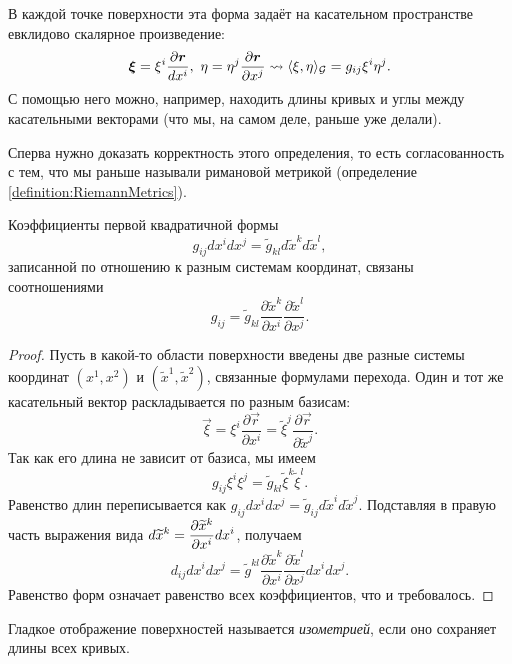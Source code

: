 В каждой точке поверхности эта форма задаёт на касательном пространстве евклидово скалярное произведение:
\[
	\vec{\xi} = \xi^i\frac{\partial \vec{r}}{dx^i},\ \eta = \eta^j\frac{\partial \vec{r}}{\partial x^j} \leadsto \langle\xi, \eta\rangle_\G = g_{ij}\xi^i\eta^j.
\]
С помощью него можно, например, находить длины кривых и углы между касательными векторами (что мы, на самом деле, раньше уже делали).

Сперва нужно доказать корректность этого определения, то есть согласованность с тем, что мы раньше называли римановой метрикой (определение \ref{definition:RiemannMetrics}).

\begin{proposition}
	Коэффициенты первой квадратичной формы
	\[
		g_{ij}dx^idx^j = \widetilde{g}_{kl}d\widetilde{x}^kd\widetilde{x}^l,
	\]
	записанной по отношению к разным системам координат, связаны соотношениями
	\[
		g_{ij} = \widetilde{g}_{kl}\frac{\partial\widetilde{x}^k}{\partial x^i}\frac{\partial \widetilde{x}^l}{\partial x^j}.
	\]
\end{proposition}

\begin{proof}
	Пусть в какой-то области поверхности введены две разные системы координат $(x^1, x^2)$ и $(\widetilde{x}^1, \widetilde{x}^2)$, связанные формулами перехода. Один и тот же касательный вектор раскладывается по разным базисам:
	\[
		\vec{\xi} = \xi^i\frac{\partial\vec{r}}{\partial x^i} = \widetilde{\xi}^j\frac{\partial\vec{r}}{\partial\widetilde{x}^j}.
	\]
	Так как его длина не зависит от базиса, мы имеем
	\[
		g_{ij}\xi^i\xi^j = \widetilde{g}_{kl}\widetilde{\xi}^k\widetilde{\xi}^l.
	\]
	Равенство длин переписывается как $g_{ij}dx^idx^j = \widetilde{g}_{ij}d\widetilde{x}^id\widetilde{x}^j$. Подставляя в правую часть выражения вида $\displaystyle d\widetilde{x}^k = \frac{\partial\widetilde{x}^k}{\partial x^i}dx^i$, получаем
	\[
		d_{ij}dx^idx^j = \widetilde{g}^{kl}\frac{\partial\widetilde{x}^k}{\partial x^i}\frac{\partial\widetilde{x}^l}{\partial x^j}dx^idx^j.
	\]
	Равенство форм означает равенство всех коэффициентов, что и требовалось.
\end{proof}

\begin{definition}
	Гладкое отображение поверхностей называется \textit{изометрией}, если оно сохраняет длины всех кривых.
\end{definition}

